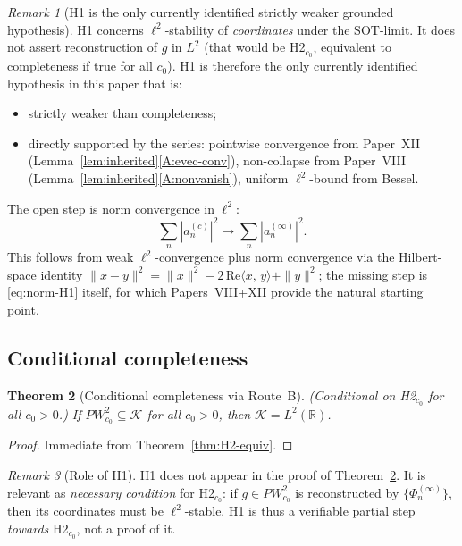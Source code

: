 \documentclass[12pt,a4paper]{amsart}
\newtheorem{theorem}{Theorem}[section]
\theoremstyle{definition}
\theoremstyle{remark}
\newtheorem{remark}[theorem]{Remark}
\newcommand{\norm}[1]{\|#1\|}
\newcommand{\ip}[2]{\langle #1,\, #2\rangle}
\newcommand{\Phiinf}[1]{\Phi_{#1}^{(\infty)}}
\newcommand{\PW}{PW}
\newcommand{\Kspace}{\mathcal{K}}
\begin{document}
\begin{remark}[H1 is the only currently identified strictly
  weaker grounded hypothesis]
\label{rem:H1-status}
H1 concerns $\ell^2$-stability of \emph{coordinates}
under the SOT-limit.
It does not assert reconstruction of $g$ in $L^2$
(that would be H2$_{c_0}$, equivalent to completeness
if true for all $c_0$).
H1 is therefore the only currently identified
hypothesis in this paper that is:
\begin{itemize}
\item strictly weaker than completeness;
\item directly supported by the series:
  pointwise convergence from Paper~XII
  (Lemma~\ref{lem:inherited}\ref{A:evec-conv}),
  non-collapse from Paper~VIII
  (Lemma~\ref{lem:inherited}\ref{A:nonvanish}),
  uniform $\ell^2$-bound from Bessel.
\end{itemize}
The open step is norm convergence in $\ell^2$:
\begin{equation}\label{eq:norm-H1}
  \textstyle\sum_n|a_n^{(c)}|^2
  \to\sum_n|a_n^{(\infty)}|^2.
\end{equation}
This follows from weak $\ell^2$-convergence plus
norm convergence via the Hilbert-space identity
$\norm{x-y}^2=\norm{x}^2-2\,\mathrm{Re}\ip{x}{y}+\norm{y}^2$;
the missing step is \eqref{eq:norm-H1} itself,
for which Papers~VIII+XII provide the natural
starting point.
\end{remark}

\subsection{Conditional completeness}

\begin{theorem}[Conditional completeness via Route~B]
\label{thm:main-B}
\textup{(Conditional on H2$_{c_0}$ for all $c_0>0$.)}
If $\PW_{c_0}^2\subseteq\Kspace$ for all $c_0>0$,
then $\Kspace = L^2(\mathbb{R})$.
\end{theorem}
\begin{proof}
Immediate from Theorem~\ref{thm:H2-equiv}.
\end{proof}

\begin{remark}[Role of H1]
\label{rem:H1-role}
H1 does not appear in the proof of
Theorem~\ref{thm:main-B}.
It is relevant as \emph{necessary condition} for
H2$_{c_0}$: if $g\in\PW_{c_0}^2$ is reconstructed
by $\{\Phiinf{n}\}$, then its coordinates must be
$\ell^2$-stable.
H1 is thus a verifiable partial step
\emph{towards} H2$_{c_0}$, not a proof of it.
\end{remark}
\end{document}
